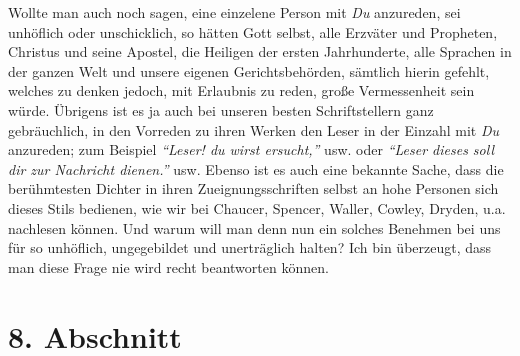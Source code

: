 Wollte man auch noch sagen, eine einzelene Person mit \textit{Du} anzureden, sei
unhöflich oder unschicklich, so hätten Gott selbst, alle
Erzväter
und Propheten,
Christus und seine Apostel, die Heiligen der ersten Jahrhunderte, alle Sprachen
in der ganzen Welt und unsere eigenen Gerichtsbehörden, sämtlich hierin
gefehlt, welches zu denken jedoch, mit Erlaubnis zu reden, große Vermessenheit
sein würde. Übrigens ist es ja auch bei unseren besten Schriftstellern ganz
gebräuchlich, in den Vorreden zu ihren Werken den Leser in der Einzahl mit
\textit{Du} anzureden; zum Beispiel \textit{"`Leser! du wirst ersucht,"'} usw. oder
\textit{"`Leser dieses
soll dir zur Nachricht dienen."'} usw. Ebenso ist es auch eine bekannte
Sache,
dass die berühmtesten Dichter in ihren Zueignungsschriften selbst an hohe
Personen sich dieses Stils bedienen, wie wir bei
Chaucer, Spencer,
Waller,
Cowley, Dryden, u.a. nachlesen
können. Und warum will man denn nun ein solches
Benehmen bei uns für so unhöflich, ungegebildet und unerträglich halten? Ich bin
überzeugt, dass man diese Frage nie wird recht beantworten können.

\section{8. Abschnitt} \label{kap10_ab8}

